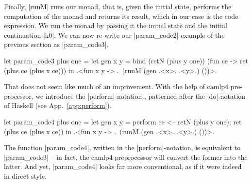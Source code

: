 \documentclass[draft]{elsart}
\begin{document}
Finally, |runM| runs our monad, that is, given the initial state,
performs the computation of
the monad and returns its result, which in our case is the code
expression. We run the monad by passing it the initial state and the
initial continuation |k0|. We can now re-write our |param_code2|
example of the previous section as |param_code3|.
\begin{code}
let param_code3 plus one =
  let gen x y = bind (retN (plus y one)) (fun ce -> 
                ret (plus ce (plus x ce)))
  in .<fun x y -> .~(runM (gen .<x>. .<y>.) ())>.
\end{code}
%
That does not seem like much of an improvement. With the help of
camlp4 pre-processor, we introduce the |perform|-notation \cite{metamonadsURL},
patterned after the |do|-notation of Haskell (see App.~\ref{app:perform}).
\begin{code}
let param_code4 plus one =
  let gen x y = perform ce <-- retN (plus y one);
                        ret (plus ce (plus x ce))
  in .<fun x y -> .~(runM (gen .<x>. .<y>.) ())>.
\end{code}
The function
|param_code4|, written in the |perform|-notation, is equivalent to
|param_code3| -- in fact, the camlp4 preprocessor will convert the
former into the latter. And yet, |param_code4| looks far more
conventional, as if it were indeed in direct style.
\end{document}
